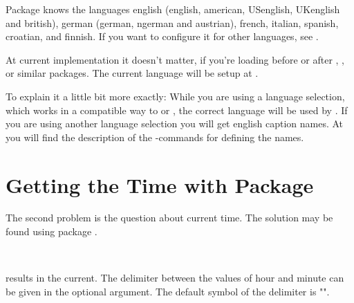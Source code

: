 Package  knows the languages english (english, american,
USenglish, UKenglish and british), german (german, ngerman and austrian),
french, italian, spanish, croatian, and finnish. If you want to configure it
for other languages, see .

At current implementation it doesn't matter, if you're loading
 before or after
,
,
 or similar packages. The current
language will be setup at .

\begin{Explain}
  To explain it a little bit more exactly: While you are using a
  language selection, which works in a compatible way to
   or
  , the correct language will be
  used by . If you are using another language
  selection you will get english caption names. At 
  you will find the description of the -commands for
  defining the names.
\end{Explain}


\section{Getting the Time with Package }
\label{sec:datetime.scrtime}

The second problem is the question about current time. The solution may be
found using package .

\begin{Declaration}%
  \\
\end{Declaration}%
%
 results in the current.
The delimiter between the values of hour and minute 
can be given in the optional argument.
The default symbol of the delimiter is "\PValue{:}".

